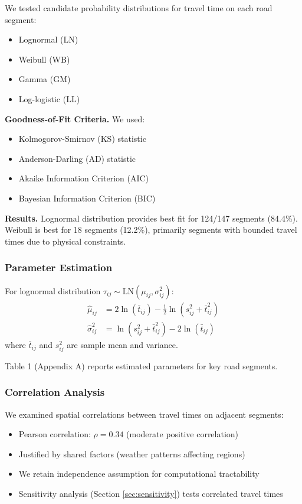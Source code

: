 We tested candidate probability distributions for travel time on each road segment:
\begin{itemize}
\item Lognormal (LN)
\item Weibull (WB)
\item Gamma (GM)
\item Log-logistic (LL)
\end{itemize}

\textbf{Goodness-of-Fit Criteria.}
We used:
\begin{itemize}
\item Kolmogorov-Smirnov (KS) statistic
\item Anderson-Darling (AD) statistic
\item Akaike Information Criterion (AIC)
\item Bayesian Information Criterion (BIC)
\end{itemize}

\textbf{Results.} Lognormal distribution provides best fit for 124/147 segments (84.4\%). Weibull is best for 18 segments (12.2\%), primarily segments with bounded travel times due to physical constraints.

\subsubsection{Parameter Estimation}

For lognormal distribution $\tau_{ij} \sim \text{LN}(\mu_{ij}, \sigma_{ij}^2)$:
\begin{align*}
\hat{\mu}_{ij} &= 2\ln(\bar{t}_{ij}) - \frac{1}{2}\ln(s_{ij}^2 + \bar{t}_{ij}^2) \\
\hat{\sigma}_{ij}^2 &= \ln(s_{ij}^2 + \bar{t}_{ij}^2) - 2\ln(\bar{t}_{ij})
\end{align*}
where $\bar{t}_{ij}$ and $s_{ij}^2$ are sample mean and variance.

Table 1 (Appendix A) reports estimated parameters for key road segments.

\subsubsection{Correlation Analysis}

We examined spatial correlations between travel times on adjacent segments:
\begin{itemize}
\item Pearson correlation: $\rho = 0.34$ (moderate positive correlation)
\item Justified by shared factors (weather patterns affecting regions)
\item We retain independence assumption for computational tractability
\item Sensitivity analysis (Section \ref{sec:sensitivity}) tests correlated travel times
\end{itemize}

